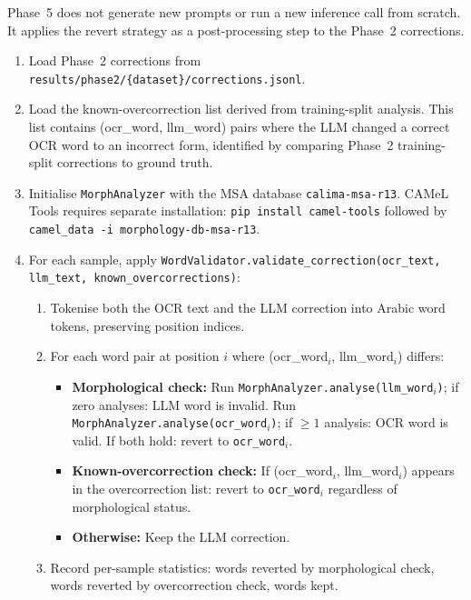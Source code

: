Phase~5 does not generate new prompts or run a new inference call from
scratch. It applies the revert strategy as a post-processing step to the
Phase~2 corrections.

\begin{enumerate}
  \item Load Phase~2 corrections from
        \texttt{results/phase2/\{dataset\}/corrections.jsonl}.

  \item Load the known-overcorrection list derived from training-split
        analysis. This list contains (ocr\_word, llm\_word) pairs where
        the LLM changed a correct OCR word to an incorrect form,
        identified by comparing Phase~2 training-split corrections to
        ground truth.

  \item Initialise \texttt{MorphAnalyzer} with the MSA database
        \texttt{calima-msa-r13}. CAMeL Tools requires separate installation:
        \texttt{pip install camel-tools} followed by
        \texttt{camel\_data -i morphology-db-msa-r13}.

  \item For each sample, apply
        \texttt{WordValidator.validate\_correction(ocr\_text, llm\_text,
        known\_overcorrections)}:
        \begin{enumerate}
          \item Tokenise both the OCR text and the LLM correction into
                Arabic word tokens, preserving position indices.
          \item For each word pair at position $i$ where
                (ocr\_word$_i$, llm\_word$_i$) differs:
                \begin{itemize}
                  \item \textbf{Morphological check:} Run
                        \texttt{MorphAnalyzer.analyse(llm\_word$_i$)};
                        if zero analyses: LLM word is invalid. Run
                        \texttt{MorphAnalyzer.analyse(ocr\_word$_i$)};
                        if $\geq 1$ analysis: OCR word is valid.
                        If both hold: revert to \texttt{ocr\_word$_i$}.
                  \item \textbf{Known-overcorrection check:} If
                        (ocr\_word$_i$, llm\_word$_i$) appears in the
                        overcorrection list: revert to \texttt{ocr\_word$_i$}
                        regardless of morphological status.
                  \item \textbf{Otherwise:} Keep the LLM correction.
                \end{itemize}
          \item Record per-sample statistics: words reverted by morphological
                check, words reverted by overcorrection check, words kept.
        \end{enumerate}


\end{enumerate}
